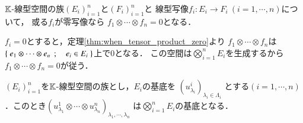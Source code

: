 	\begin{screen}
		\begin{thm}[零写像のテンソル積は零写像]
		\label{thm:tensor_product_contains_zero_mapping_is_zero}
			$\mathbb{K}$-線型空間の族$(E_i)_{i=1}^n$と$(F_i)_{i=1}^n$と
			線型写像$f_i:E_i \longrightarrow F_i\ (i=1,\cdots,n)$について，
			或る$f_i$が零写像なら
			$f_1 \otimes \cdots \otimes f_n = 0$となる．
		\end{thm}
	\end{screen}
	
	\begin{prf}
		$f_i = 0$とすると，定理\ref{thm:when_tensor_product_zero}より
		$f_1 \otimes \cdots \otimes f_n$は
		$\left\{\ e_1 \otimes \cdots \otimes e_n\ \, ; \quad e_i \in E_i\ \right\}$上で0となる．
		この空間は$\bigotimes_{i=1}^{n} E_i$を生成するから
		$f_1 \otimes \cdots \otimes f_n = 0$が従う．
		\QED
	\end{prf}
	
	\begin{screen}
		\begin{thm}[テンソル積の基底]
			$(E_i)_{i=1}^n$を$\mathbb{K}$-線型空間の族とし，$E_i$の基底を
			$\left( u^i_{\lambda_i} \right)_{\lambda_i \in \Lambda_i}$
			とする$(i=1,\cdots,n)$．このとき$\left( u^1_{\lambda_1} \otimes 
			\cdots \otimes u^n_{\lambda_n} \right)_{\lambda_1,\cdots,\lambda_n}$
			は$\bigotimes_{i=1}^n E_i$の基底となる．
		\end{thm}
	\end{screen}
	

